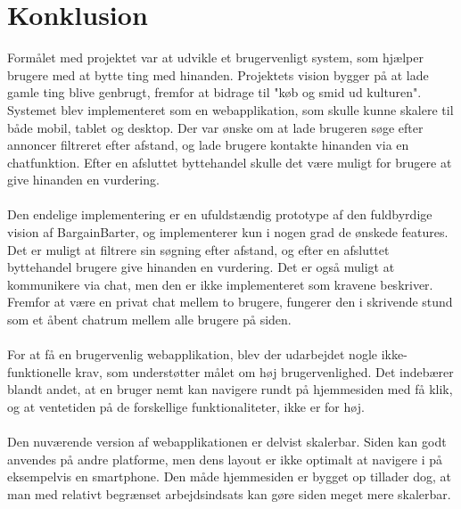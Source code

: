\chapter{Konklusion}
Formålet med projektet var at udvikle et brugervenligt system, som hjælper brugere med at bytte ting med hinanden. Projektets vision bygger på at lade gamle ting blive genbrugt, fremfor at bidrage til "køb og smid ud kulturen". Systemet blev implementeret som en webapplikation, som skulle kunne skalere til både mobil, tablet og desktop. Der var ønske om at lade brugeren søge efter annoncer filtreret efter afstand, og lade brugere kontakte hinanden via en chatfunktion. Efter en afsluttet byttehandel skulle det være muligt for brugere at give hinanden en vurdering. \\ \\ \noindent
Den endelige implementering er en ufuldstændig prototype af den fuldbyrdige vision af BargainBarter, og implementerer kun i nogen grad de ønskede features. Det er muligt at filtrere sin søgning efter afstand, og efter en afsluttet byttehandel brugere give hinanden en vurdering. Det er også muligt at kommunikere via chat, men den er ikke implementeret som kravene beskriver. Fremfor at være en privat chat mellem to brugere, fungerer den i skrivende stund som et åbent chatrum mellem alle brugere på siden. 
\\ \\ \noindent
For at få en brugervenlig webapplikation, blev der udarbejdet nogle ikke-funktionelle krav, som understøtter målet om høj brugervenlighed. Det indebærer blandt andet, at en bruger nemt kan navigere rundt på hjemmesiden med få klik, og at ventetiden på de forskellige funktionaliteter, ikke er for høj. \\ \\ \noindent
Den nuværende version af webapplikationen er delvist skalerbar. Siden kan godt anvendes på andre platforme, men dens layout er ikke optimalt at navigere i på eksempelvis en smartphone. Den måde hjemmesiden er bygget op tillader dog, at man med relativt begrænset arbejdsindsats kan gøre siden meget mere skalerbar. 




